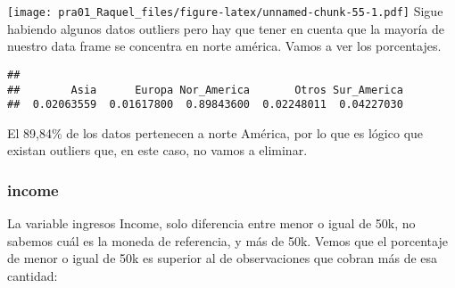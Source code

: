 \documentclass[]{article}
\newenvironment{Shaded}{\begin{snugshade}}{\end{snugshade}}
\newcommand{\DataTypeTok}[1]{\textcolor[rgb]{0.87,0.87,0.75}{#1}}
\newcommand{\DecValTok}[1]{\textcolor[rgb]{0.86,0.86,0.80}{#1}}
\newcommand{\FloatTok}[1]{\textcolor[rgb]{0.75,0.75,0.82}{#1}}
\newcommand{\KeywordTok}[1]{\textcolor[rgb]{0.94,0.87,0.69}{#1}}
\newcommand{\NormalTok}[1]{\textcolor[rgb]{0.80,0.80,0.80}{#1}}
\newcommand{\OperatorTok}[1]{\textcolor[rgb]{0.94,0.94,0.82}{#1}}
\newcommand{\StringTok}[1]{\textcolor[rgb]{0.80,0.58,0.58}{#1}}
\begin{document}
\begin{Shaded}
\end{Shaded}

\texttt{[image: pra01\_Raquel\_files/figure-latex/unnamed-chunk-55-1.pdf]}
Sigue habiendo algunos datos outliers pero hay que tener en cuenta que
la mayoría de nuestro data frame se concentra en norte américa. Vamos a
ver los porcentajes.

\begin{Shaded}
\end{Shaded}

\begin{verbatim}
## 
##        Asia      Europa Nor_America       Otros Sur_America 
##  0.02063559  0.01617800  0.89843600  0.02248011  0.04227030
\end{verbatim}

El 89,84\% de los datos pertenecen a norte América, por lo que es lógico
que existan outliers que, en este caso, no vamos a eliminar.

\hypertarget{income}{%
\subsubsection{income}\label{income}}

La variable ingresos Income, solo diferencia entre menor o igual de 50k,
no sabemos cuál es la moneda de referencia, y más de 50k. Vemos que el
porcentaje de menor o igual de 50k es superior al de observaciones que
cobran más de esa cantidad:

\begin{Shaded}
\end{Shaded}
\end{document}
